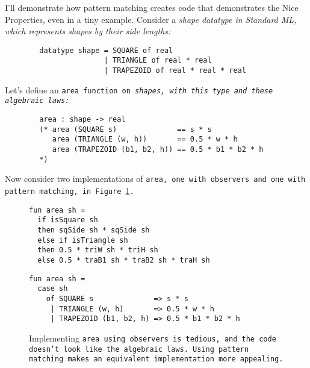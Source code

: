 \documentclass[manuscript,screen,review, 12pt, nonacm]{acmart}
\begin{document}
\begin{outline}[enumerate]
I'll demonstrate how pattern matching creates code that demonstrates the Nice
Properties, even in a tiny example. Consider a \it{shape} datatype in Standard
ML, which represents shapes by their side lengths: 

\begin{minipage}[t]{\textwidth}
    \begin{verbatim}
        datatype shape = SQUARE of real 
                       | TRIANGLE of real * real 
                       | TRAPEZOID of real * real * real
\end{verbatim}
\end{minipage}

Let's define an \tt{area} function on \it{shape}s, with this type and these
algebraic laws: 

\begin{minipage}[t]{\textwidth}
    \begin{verbatim}
        area : shape -> real 
        (* area (SQUARE s)              == s * s 
           area (TRIANGLE (w, h))       == 0.5 * w * h
           area (TRAPEZOID (b1, b2, h)) == 0.5 * b1 * b2 * h
        *)
\end{verbatim}
\end{minipage}

Now consider two implementations of \tt{area}, one with observers and one with
pattern matching, in Figure~\ref{fig:area}.

    \begin{figure}[H]
      \begin{minipage}[t]{0.7\textwidth}
        \begin{verbatim}
fun area sh =
  if isSquare sh
  then sqSide sh * sqSide sh
  else if isTriangle sh 
  then 0.5 * triW sh * triH sh
  else 0.5 * traB1 sh * traB2 sh * traH sh
            \end{verbatim}
            \label{fig:observerarea} 
      \end{minipage}
      \vfill
      \begin{minipage}[t]{0.7\textwidth}
        \begin{verbatim}
fun area sh =
  case sh 
    of SQUARE s              => s * s
     | TRIANGLE (w, h)       => 0.5 * w * h
     | TRAPEZOID (b1, b2, h) => 0.5 * b1 * b2 * h
                \end{verbatim}
       \vspace{2.2em}
       \label{fig:pmarea}
      \end{minipage}
      \caption{Implementing \tt{area} using observers is tedious, and the code
      doesn't look like the algebraic laws. Using pattern matching makes an
      equivalent implementation more appealing.}
      \label{fig:area}
    \end{figure}


\end{outline}
\end{document}
